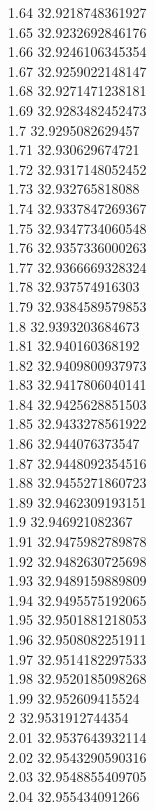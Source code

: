 {1.64	32.9218748361927\\
1.65	32.9232692846176\\
1.66	32.9246106345354\\
1.67	32.9259022148147\\
1.68	32.9271471238181\\
1.69	32.9283482452473\\
1.7	32.9295082629457\\
1.71	32.930629674721\\
1.72	32.9317148052452\\
1.73	32.932765818088\\
1.74	32.9337847269367\\
1.75	32.9347734060548\\
1.76	32.9357336000263\\
1.77	32.9366669328324\\
1.78	32.937574916303\\
1.79	32.9384589579853\\
1.8	32.9393203684673\\
1.81	32.940160368192\\
1.82	32.9409800937973\\
1.83	32.9417806040141\\
1.84	32.9425628851503\\
1.85	32.9433278561922\\
1.86	32.944076373547\\
1.87	32.9448092354516\\
1.88	32.9455271860723\\
1.89	32.9462309193151\\
1.9	32.946921082367\\
1.91	32.9475982789878\\
1.92	32.9482630725698\\
1.93	32.9489159889809\\
1.94	32.9495575192065\\
1.95	32.9501881218053\\
1.96	32.9508082251911\\
1.97	32.9514182297533\\
1.98	32.9520185098268\\
1.99	32.952609415524\\
2	32.9531912744354\\
2.01	32.9537643932114\\
2.02	32.9543290590316\\
2.03	32.9548855409705\\
2.04	32.955434091266\\
}
